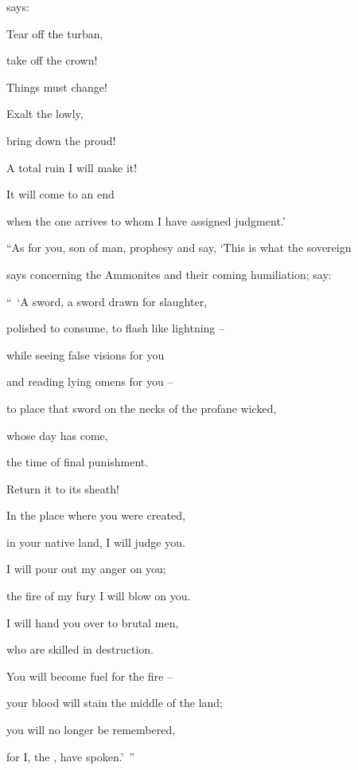 {{}
says:
\par }{\Q Tear off
the turban,
\par }{\Q take off the crown!
\par }{\Q Things must
change!

\par }{\Q Exalt
the lowly,
\par }{\Q bring down
the proud!
\par }{\Q {}A total
ruin
I will make
it!

\par }{\Q It will come
to an end
\par }{\Q when the one arrives
to whom
I have assigned
judgment.’
\par }{\PP {}“As for you,
son
of man,
prophesy
and say,
‘This is what
the sovereign

{}
says
concerning the Ammonites
and their coming humiliation;
say:
\par }{\Q “ ‘A sword,
a sword
drawn
for slaughter,
\par }{\Q polished
to consume,
to flash
like lightning –
\par }{\Q {}while seeing
false visions
for you
\par }{\Q and reading
lying
omens for you –
\par }{\Q to place that sword on the necks of the profane wicked,
\par }{\Q whose day has come,
\par }{\Q the time of final punishment.
\par }{\Q {}Return
it to
its sheath!

\par }{\Q In the place
where
you were created,
\par }{\Q in your native
land,
I will judge you.
\par }{\Q {}I will pour
out my anger
on
you;
\par }{\Q the fire
of my fury
I will blow
on
you.
\par }{\Q I will
hand
you over to brutal men,
\par }{\Q who are skilled
in destruction.
\par }{\Q {}You will become
fuel
for the fire
–
\par }{\Q your blood
will stain the middle
of the land;
\par }{\Q you will no
longer be remembered,
\par }{\Q for
I,
the {}, have spoken.’ ”

}
